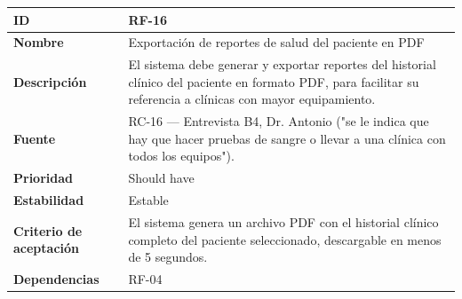 \documentclass[
]{article}
\newcounter{none} %
\begin{document}
{\def\LTcaptype{none} %
\begin{longtable}[]{@{}
  >{\raggedright\arraybackslash}p{}
  >{\raggedright\arraybackslash}p{}@{}}
\toprule\noalign{}
\begin{minipage}[b]{\linewidth}\raggedright
\textbf{ID}
\end{minipage} & \begin{minipage}[b]{\linewidth}\raggedright
RF-16
\end{minipage} \\
\midrule\noalign{}
\endhead
\bottomrule\noalign{}
\endlastfoot
\textbf{Nombre} & \begin{minipage}[t]{\linewidth}\raggedright
Exportación de reportes de salud del paciente en PDF
\end{minipage} \\
\textbf{Descripción} & \begin{minipage}[t]{\linewidth}\raggedright
El sistema debe generar y exportar reportes del historial clínico del
paciente en formato PDF, para facilitar su referencia a clínicas con
mayor equipamiento.
\end{minipage} \\
\textbf{Fuente} & \begin{minipage}[t]{\linewidth}\raggedright
RC-16 --- Entrevista B4, Dr. Antonio ("se le indica que hay que hacer
pruebas de sangre o llevar a una clínica con todos los equipos").
\end{minipage} \\
\textbf{Prioridad} & \begin{minipage}[t]{\linewidth}\raggedright
Should have
\end{minipage} \\
\textbf{Estabilidad} & \begin{minipage}[t]{\linewidth}\raggedright
Estable
\end{minipage} \\
\textbf{Criterio de aceptación} &
\begin{minipage}[t]{\linewidth}\raggedright
El sistema genera un archivo PDF con el historial clínico completo del
paciente seleccionado, descargable en menos de 5 segundos.
\end{minipage} \\
\textbf{Dependencias} & \begin{minipage}[t]{\linewidth}\raggedright
RF-04
\end{minipage} \\
\end{longtable}
}
\end{document}
